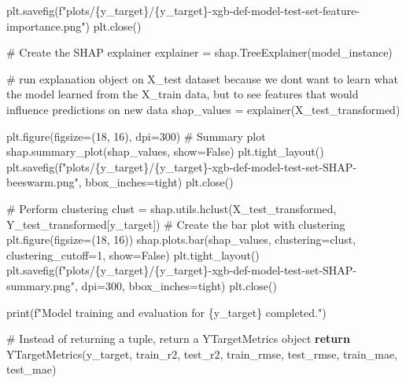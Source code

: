 \documentclass[
  letterpaper,
  DIV=11,
  numbers=noendperiod]{scrartcl}
\newenvironment{Shaded}{\begin{snugshade}}{\end{snugshade}}
\newcommand{\BuiltInTok}[1]{\textcolor[rgb]{0.00,0.23,0.31}{#1}}
\newcommand{\CommentTok}[1]{\textcolor[rgb]{0.37,0.37,0.37}{#1}}
\newcommand{\ControlFlowTok}[1]{\textcolor[rgb]{0.00,0.23,0.31}{\textbf{#1}}}
\newcommand{\DecValTok}[1]{\textcolor[rgb]{0.68,0.00,0.00}{#1}}
\newcommand{\NormalTok}[1]{\textcolor[rgb]{0.00,0.23,0.31}{#1}}
\newcommand{\OperatorTok}[1]{\textcolor[rgb]{0.37,0.37,0.37}{#1}}
\newcommand{\SpecialCharTok}[1]{\textcolor[rgb]{0.37,0.37,0.37}{#1}}
\newcommand{\SpecialStringTok}[1]{\textcolor[rgb]{0.13,0.47,0.30}{#1}}
\newcommand{\StringTok}[1]{\textcolor[rgb]{0.13,0.47,0.30}{#1}}
\newcommand{\VariableTok}[1]{\textcolor[rgb]{0.07,0.07,0.07}{#1}}
\begin{document}
\begin{Shaded}
\begin{Highlighting}[]
\NormalTok{    plt.savefig(}\SpecialStringTok{f"plots/}\SpecialCharTok{\{}\NormalTok{y\_target}\SpecialCharTok{\}}\SpecialStringTok{/}\SpecialCharTok{\{}\NormalTok{y\_target}\SpecialCharTok{\}}\SpecialStringTok{{-}xgb{-}def{-}model{-}test{-}set{-}feature{-}importance.png"}\NormalTok{)}
\NormalTok{    plt.close()}

    \CommentTok{\# Create the SHAP explainer}
\NormalTok{    explainer }\OperatorTok{=}\NormalTok{ shap.TreeExplainer(model\_instance)}

    \CommentTok{\# run explanation object on X\_test dataset because we don\textquotesingle{}t want to learn what the model learned from the X\_train data, but to see features that would influence predictions on new data}
\NormalTok{    shap\_values }\OperatorTok{=}\NormalTok{ explainer(X\_test\_transformed)}

\NormalTok{    plt.figure(figsize}\OperatorTok{=}\NormalTok{(}\DecValTok{18}\NormalTok{, }\DecValTok{16}\NormalTok{), dpi}\OperatorTok{=}\DecValTok{300}\NormalTok{) }
    \CommentTok{\# Summary plot}
\NormalTok{    shap.summary\_plot(shap\_values, show}\OperatorTok{=}\VariableTok{False}\NormalTok{)}
\NormalTok{    plt.tight\_layout()}
\NormalTok{    plt.savefig(}\SpecialStringTok{f"plots/}\SpecialCharTok{\{}\NormalTok{y\_target}\SpecialCharTok{\}}\SpecialStringTok{/}\SpecialCharTok{\{}\NormalTok{y\_target}\SpecialCharTok{\}}\SpecialStringTok{{-}xgb{-}def{-}model{-}test{-}set{-}SHAP{-}beeswarm.png"}\NormalTok{, bbox\_inches}\OperatorTok{=}\StringTok{\textquotesingle{}tight\textquotesingle{}}\NormalTok{)}
\NormalTok{    plt.close()}

    \CommentTok{\# Perform clustering}
\NormalTok{    clust }\OperatorTok{=}\NormalTok{ shap.utils.hclust(X\_test\_transformed, Y\_test\_transformed[y\_target])}
    \CommentTok{\# Create the bar plot with clustering}
\NormalTok{    plt.figure(figsize}\OperatorTok{=}\NormalTok{(}\DecValTok{18}\NormalTok{, }\DecValTok{16}\NormalTok{)) }
\NormalTok{    shap.plots.bar(shap\_values, clustering}\OperatorTok{=}\NormalTok{clust, clustering\_cutoff}\OperatorTok{=}\DecValTok{1}\NormalTok{, show}\OperatorTok{=}\VariableTok{False}\NormalTok{)}
\NormalTok{    plt.tight\_layout()}
\NormalTok{    plt.savefig(}\SpecialStringTok{f"plots/}\SpecialCharTok{\{}\NormalTok{y\_target}\SpecialCharTok{\}}\SpecialStringTok{/}\SpecialCharTok{\{}\NormalTok{y\_target}\SpecialCharTok{\}}\SpecialStringTok{{-}xgb{-}def{-}model{-}test{-}set{-}SHAP{-}summary.png"}\NormalTok{, dpi}\OperatorTok{=}\DecValTok{300}\NormalTok{, bbox\_inches}\OperatorTok{=}\StringTok{\textquotesingle{}tight\textquotesingle{}}\NormalTok{)}
\NormalTok{    plt.close()}

    \BuiltInTok{print}\NormalTok{(}\SpecialStringTok{f"Model training and evaluation for }\SpecialCharTok{\{}\NormalTok{y\_target}\SpecialCharTok{\}}\SpecialStringTok{ completed."}\NormalTok{)}

    \CommentTok{\# Instead of returning a tuple, return a YTargetMetrics object}
    \ControlFlowTok{return}\NormalTok{ YTargetMetrics(y\_target, train\_r2, test\_r2, train\_rmse, test\_rmse, train\_mae, test\_mae)}
\end{Highlighting}
\end{Shaded}
\end{document}
